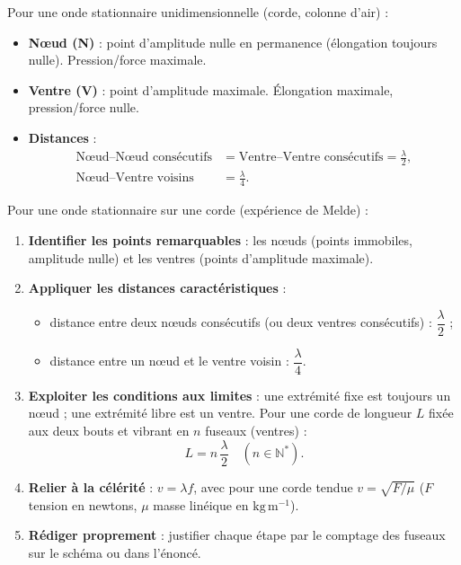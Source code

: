 \documentclass[11pt]{article}
\newcommand{\cle}[1]{{\popxbold\color{popdark}#1}}
\begin{document}
\begin{propriete}
Pour une onde stationnaire unidimensionnelle (corde, colonne d'air) :
\begin{itemize}
\item \textbf{Nœud (N)} : point d'amplitude nulle en permanence (élongation toujours nulle). Pression/force maximale.
\item \textbf{Ventre (V)} : point d'amplitude maximale. Élongation maximale, pression/force nulle.
\item \textbf{Distances} :
  \begin{align*}
  \text{Nœud--Nœud consécutifs} &= \text{Ventre--Ventre consécutifs} = \frac{\lambda}{2}, \\
  \text{Nœud--Ventre voisins} &= \frac{\lambda}{4}.
  \end{align*}
\end{itemize}
\end{propriete}

\begin{methode}
Pour une \cle{onde stationnaire} sur une corde (expérience de Melde) :
\begin{enumerate}
\item \textbf{Identifier les points remarquables} : les \cle{nœuds} (points immobiles, amplitude nulle) et les \cle{ventres} (points d'amplitude maximale).
\item \textbf{Appliquer les distances caractéristiques} :
\begin{itemize}
\item distance entre deux nœuds consécutifs (ou deux ventres consécutifs) : $\dfrac{\lambda}{2}$ ;
\item distance entre un nœud et le ventre voisin : $\dfrac{\lambda}{4}$.
\end{itemize}
\item \textbf{Exploiter les conditions aux limites} : une extrémité fixe est toujours un nœud ; une extrémité libre est un ventre. Pour une corde de longueur $L$ fixée aux deux bouts et vibrant en $n$ fuseaux (ventres) :
\[ L = n\,\frac{\lambda}{2} \quad (n \in \mathbb{N}^{*}). \]
\item \textbf{Relier à la célérité} : $v = \lambda f$, avec pour une corde tendue $v = \sqrt{F/\mu}$ ($F$ tension en newtons, $\mu$ masse linéique en $\mathrm{kg\,m^{-1}}$).
\item \textbf{Rédiger proprement} : justifier chaque étape par le comptage des fuseaux sur le schéma ou dans l'énoncé.
\end{enumerate}
\end{methode}
\end{document}
